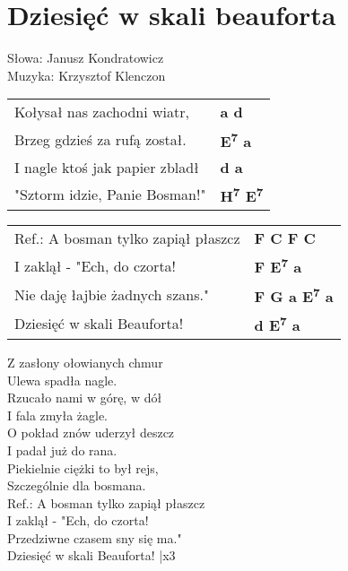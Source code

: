 \section{Dziesięć w skali beauforta}

Słowa: Janusz Kondratowicz\\
Muzyka: Krzysztof Klenczon

\vspace{2em}
\begin{tabular}{@{}p{7cm}@{}l@{}}
Kołysał nas zachodni wiatr, & \bfseries  a d \\
Brzeg gdzieś za rufą został. & \bfseries  E\textsuperscript{7} a \\
I nagle ktoś jak papier zbladł  & \bfseries  d a \\
"Sztorm idzie, Panie Bosman!" & \bfseries  H\textsuperscript{7} E\textsuperscript{7} \\
\end{tabular}

\vspace{1em}
\begin{tabular}{@{}p{7cm}@{}l@{}}
Ref.: A bosman tylko zapiął płaszcz & \bfseries  F C F C \\
I zaklął - "Ech, do czorta! & \bfseries  F E\textsuperscript{7} a \\
Nie daję łajbie żadnych szans." & \bfseries  F G a E\textsuperscript{7} a \\
Dziesięć w skali Beauforta! & \bfseries  d E\textsuperscript{7} a \\
\end{tabular}

\vspace{1em}
Z zasłony ołowianych chmur \\
Ulewa spadła nagle. \\
Rzucało nami w górę, w dół \\
I fala zmyła żagle. \\

O pokład znów uderzył deszcz \\
I padał już do rana. \\
Piekielnie ciężki to był rejs, \\
Szczególnie dla bosmana. \\

Ref.: A bosman tylko zapiął płaszcz \\
I zaklął - "Ech, do czorta! \\
Przedziwne czasem sny się ma." \\
Dziesięć w skali Beauforta!  |x3 \\